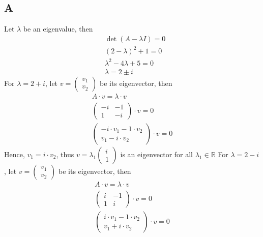 \documentclass[11pt]{article}
\begin{document}
\subsection*{A}
Let $\lambda$ be an eigenvalue, then 
\begin{equation*}
    \begin{aligned}
        &\det (A - \lambda I) = 0 \\
        &(2-\lambda)^2 + 1 = 0 \\
        &\lambda^2 -4\lambda + 5 = 0 \\
        &\lambda = 2 \pm i
    \end{aligned}
\end{equation*}
For $\lambda = 2+i$, let 
$
v= 
\begin{pmatrix}
v_1 \\
v_2    
\end{pmatrix}$ be its eigenvector, then
\begin{equation*}
    \begin{aligned}
        A \cdot v = \lambda \cdot v \\
        \begin{pmatrix}
            -i & -1 \\
            1 & -i
        \end{pmatrix}
        \cdot v = 0 \\
        \begin{pmatrix}
            -i \cdot v_1 - 1 \cdot v_2 \\
            v_1  -i \cdot v_2
        \end{pmatrix} \cdot v
        =0 
    \end{aligned}
\end{equation*}
Hence, $v_1 = i\cdot v_2$, thus $v = \lambda_1 \begin{pmatrix}
    i \\
    1
\end{pmatrix}
$
is an eigenvector for all $\lambda_1 \in \mathbb{R}$
For $\lambda = 2-i$, let 
$
v= 
\begin{pmatrix}
v_1 \\
v_2    
\end{pmatrix}$ be its eigenvector, then
\begin{equation*}
    \begin{aligned}
        A \cdot v = \lambda \cdot v \\
        \begin{pmatrix}
            i & -1 \\
            1 & i
        \end{pmatrix}
        \cdot v = 0 \\
        \begin{pmatrix}
            i \cdot v_1 - 1 \cdot v_2 \\
            v_1  +i \cdot v_2
        \end{pmatrix} \cdot v
        =0 
    \end{aligned}
\end{equation*}
\end{document}
